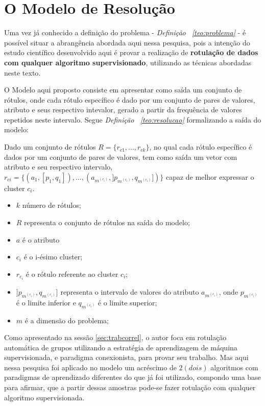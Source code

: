 \section{O Modelo de Resolução}

Uma vez já conhecido a definição do problema - \textit{Definição ~\ref{teo:problema}} - é possível situar a abrangência abordada aqui nessa pesquisa, pois a intenção do estudo científico desenvolvido aqui é provar a realização de \textbf{rotulação de dados com qualquer algoritmo supervisionado}, utilizando as técnicas abordadas neste texto.

O Modelo aqui proposto consiste em apresentar como saída um conjunto de rótulos, onde cada rótulo específico é dado por um conjunto de pares de valores, atributo e seus respectivo intevalor, gerado a partir da frequência de valores repetidos neste intervalo. Segue \textit{Definição ~\ref{teo:resolucao}} formalizando a saída do modelo:
    \begin{defprob}
    Dado um conjunto de rótulos ${ R=\{ r_{c1},...,r_{ck} \} }$, no qual cada rótulo específico é dados por um conjunto de pares de valores, tem como saída um vetor com atributo e seu respectivo intervalo, ${ r_{ci}=\{ (a_1,[p_1,q_1]),...,(a_{m^{(c_i)}}, ]p_{m^{(c_i)}},q_{m^{(c_i)}}]) \} }$ capaz de melhor expressar o cluster ${c_i}$.
        \footnotemark 
        \begin{itemize}[noitemsep]
            \item ${k}$ número de rótulos;
            \item ${R}$ representa o conjunto de rótulos na saída do modelo;
            \item ${a}$ é o atributo
            \item ${c_i}$ é o i-ésimo cluster;
            \item ${r_{c_i}}$ é o rótulo referente ao cluster ${c_i}$;
            \item ${]p_{m^{(c_i)}},q_{m^{(c_i)}}]}$ representa o intervalo de valores do atributo ${a_{m^{(c_i)}} }$, onde ${ p_{m^{(c_i)}} }$  é o limite inferior e ${ q_{m^{(c_i)}} }$ é o limite superior;
            \item ${m}$ é a dimensão do problema;
        \end{itemize}
    \label{teo:resolucao}
    \end{defprob}

Como apresentado na sessão \ref{sec:trabcorrel}, o autor foca em rotulação automática de grupos utilizando a estratégia de aprendizagem de máquina supervisionada, e paradigma conexionista, para provar seu trabalho. Mas aqui nessa pesquisa foi aplicado no modelo um acréscimo de ${2 (dois)}$ algoritmos com paradigmas de aprendizado diferentes do que já foi utilizado, compondo uma base para afirmar, que a partir dessas amostras pode-se fazer rotulação com qualquer algoritmo supervisionada.


